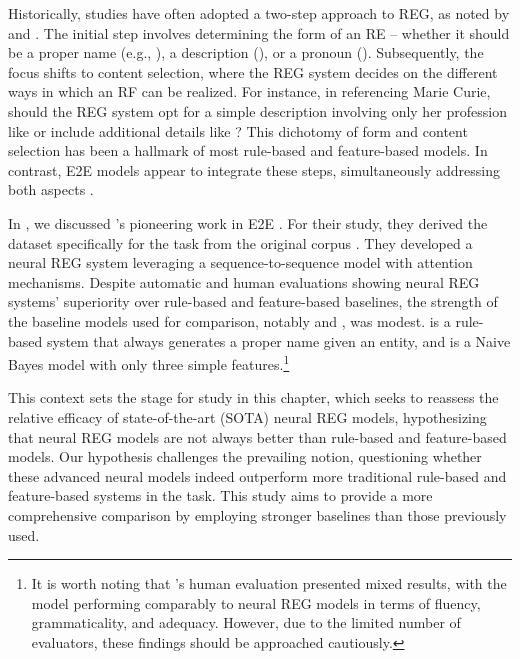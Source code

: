 Historically, \context studies have often adopted a two-step approach to REG, as noted by \citet{henschel2000pronominalization} and \citet{krahmer2002efficient}. The initial step involves determining the form of an RE -- whether it should be a proper name (e.g., ), a description (), or a pronoun (). Subsequently, the focus shifts to content selection, where the REG system decides on the different ways in which an RF can be realized. For instance, in referencing Marie Curie, should the REG system opt for a simple description involving only her profession like  or include additional details like ? This dichotomy of form and content selection has been a hallmark of most rule-based and feature-based models. In contrast, E2E models appear to integrate these steps, simultaneously addressing both aspects \citep{ferreira2018neuralreg, cao2019referring, cunha-etal-2020-referring}.

In , we discussed \citet{ferreira2018neuralreg}'s pioneering work in E2E \context. For their study, they derived the \webnlg dataset specifically for the \context task from the original \webnlg corpus \citep{gardent-etal-2017-creating}. They developed a neural REG system leveraging a sequence-to-sequence model with attention mechanisms. Despite automatic and human evaluations showing neural REG systems' superiority over rule-based and feature-based baselines, the strength of the baseline models used for comparison, notably  and , was modest.  is a rule-based system that always generates a proper name given an entity, and  is a Naive Bayes model with only three simple features.\footnote{It is worth noting that \citet{cunha-etal-2020-referring}'s human evaluation presented mixed results, with the  model performing comparably to neural REG models in terms of fluency, grammaticality, and adequacy. However, due to the limited number of evaluators, these findings should be approached cautiously.}

This context sets the stage for study \studF in this chapter, which seeks to reassess the relative efficacy of state-of-the-art (SOTA) neural REG models, hypothesizing that neural REG models are not always better than rule-based and feature-based models. Our hypothesis challenges the prevailing notion, questioning whether these advanced neural models indeed outperform more traditional rule-based and feature-based systems in the \context task. This study aims to provide a more comprehensive comparison by employing stronger baselines than those previously used.

